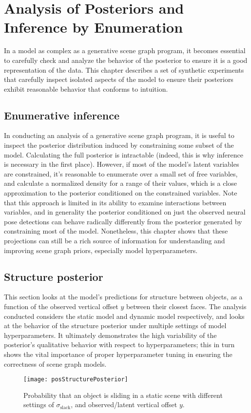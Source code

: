 \chapter{Analysis of Posteriors and Inference by Enumeration} \label{chap:4}
In a model as complex as a generative scene graph program, it becomes essential to carefully check and analyze the behavior of the posterior to ensure it is a good representation of the data.
This chapter describes a set of synthetic experiments that carefully inspect isolated aspects of the model to ensure their posteriors exhibit reasonable behavior that conforms to intuition.

\section{Enumerative inference}
In conducting an analysis of a generative scene graph program, it is useful to inspect the posterior distribution induced by constraining some subset of the model.
Calculating the full posterior is intractable (indeed, this is why inference is necessary in the first place).
However, if most of the model's latent variables are constrained, it's reasonable to enumerate over a small set of free variables, and calculate a normalized density for a range of their values, which is a close approximation to the posterior conditioned on the constrained variables.
Note that this approach is limited in its ability to examine interactions between variables, and in generality the posterior conditioned on just the observed neural pose detections can behave radically differently from the posterior generated by constraining most of the model.
Nonetheless, this chapter shows that these projections can still be a rich source of information for understanding and improving scene graph priors, especially model hyperparameters.

\section{Structure posterior} \label{section:structureAnalysis}
This section looks at the model's predictions for structure between objects, as a function of the observed vertical offset $y$ between their closest faces.
The analysis conducted considers the static model and dynamic model respectively, and looks at the behavior of the structure posterior under multiple settings of model hyperparameters.
It ultimately demonstrates the high variability of the posterior's qualitative behavior with respect to hyperparameters; this in turn shows the vital importance of proper hyperparameter tuning in ensuring the correctness of scene graph models.
\begin{figure}[h]
  \centering
  \texttt{[image: posStructurePosterior]}
  \caption{
    Probability that an object is sliding in a static scene with different settings of $\sigma_\mathrm{slack}$, and observed/latent vertical offset $y$.
  }
  \label{fig:posStructurePosterior}
\end{figure}

